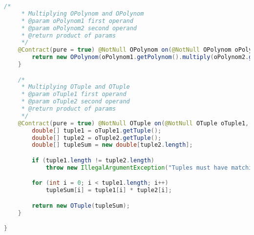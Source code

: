 \begin{lstlisting}[caption=Times (Schwenke),label=list:Times,language=Java]
    /*
     * Multiplying OPolynom and OPolynom
     * @param oPolynom1 first operand
     * @param oPolynom2 second operand
     * @return product of params
     */
    @Contract(pure = true) @NotNull OPolynom on(@NotNull OPolynom oPolynom1, @NotNull OPolynom oPolynom2) {
        return new OPolynom(oPolynom1.getPolynom().multiply(oPolynom2.getPolynom()));
    }

    /*
     * Multiplying OTuple and OTuple
     * @param oTuple1 first operand
     * @param oTuple2 second operand
     * @return product of params
     */
    @Contract(pure = true) @NotNull OTuple on(@NotNull OTuple oTuple1, @NotNull OTuple oTuple2) {
        double[] tuple1 = oTuple1.getTuple();
        double[] tuple2 = oTuple2.getTuple();
        double[] tupleSum = new double[tuple2.length];

        if (tuple1.length != tuple2.length)
            throw new IllegalArgumentException("Tuples must have matching size.");

        for (int i = 0; i < tuple1.length; i++)
            tupleSum[i] = tuple1[i] * tuple2[i];

        return new OTuple(tupleSum);
    }

}
\end{lstlisting}    

